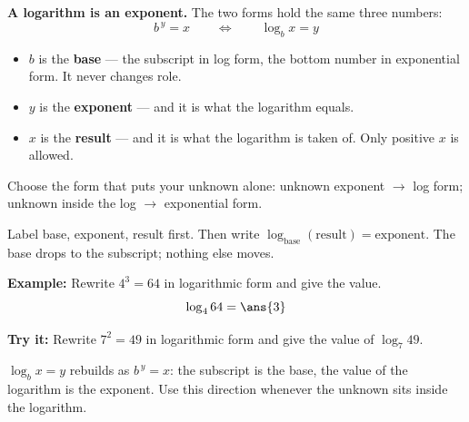 \documentclass[12pt]{article}
\begin{document}

\begin{formulabox}
\textbf{A logarithm is an exponent.} The two forms hold the same three numbers:
\[ b^{\,y} = x \qquad\Longleftrightarrow\qquad \log_b x = y \]
\begin{itemize}[leftmargin=0.9cm, itemsep=1pt, topsep=1pt]
\item $b$ is the \textbf{base} --- the subscript in log form, the bottom number
in exponential form. It never changes role.
\item $y$ is the \textbf{exponent} --- and it is what the logarithm equals.
\item $x$ is the \textbf{result} --- and it is what the logarithm is taken of.
Only positive $x$ is allowed.
\end{itemize}
Choose the form that puts your unknown alone: unknown exponent $\to$ log form;
unknown inside the log $\to$ exponential form.
\end{formulabox}


\begin{formulabox}
Label base, exponent, result first. Then write $\log_{\text{base}}(\text{result})
= \text{exponent}$. The base drops to the subscript; nothing else moves.
\end{formulabox}

\begin{examplebox}
\textbf{Example:} Rewrite $4^3 = 64$ in logarithmic form and give the value.
\[ \log_4 64 = \ans{3} \]
\end{examplebox}

\begin{tryitbox}
\textbf{Try it:} Rewrite $7^2 = 49$ in logarithmic form and give the value of
$\log_7 49$.\\[2pt]
\end{tryitbox}


\begin{formulabox}
$\log_b x = y$ rebuilds as $b^{\,y} = x$: the subscript is the base, the value of
the logarithm is the exponent. Use this direction whenever the unknown sits
inside the logarithm.
\end{formulabox}
\end{document}
